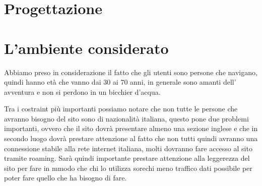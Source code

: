 \section{Progettazione}
\section{L'ambiente considerato}

Abbiamo preso in considerazione il fatto che gli utenti sono persone che navigano, quindi hanno età che vanno dai 30 ai 70 anni, in generale sono amanti dell' avventura e non si perdono in un bicchier d'acqua.

Tra i costraint più importanti possiamo notare che non tutte le persone che avranno bisogno del sito sono di nazionalità italiana, questo pone due problemi importanti, ovvero che il sito dovrà presentare almeno una sezione inglese e che in secondo luogo dovrà prestare attenzione al fatto che non tutti quindi avranno una connessione stabile alla rete internet italiana, molti dovranno fare accesso al sito tramite roaming. Sarà quindi importante prestare attenzione alla leggerezza del sito per fare in mmodo che chi lo utilizza sorechi meno traffico dati possibile per poter fare quello che ha bisogno di fare.